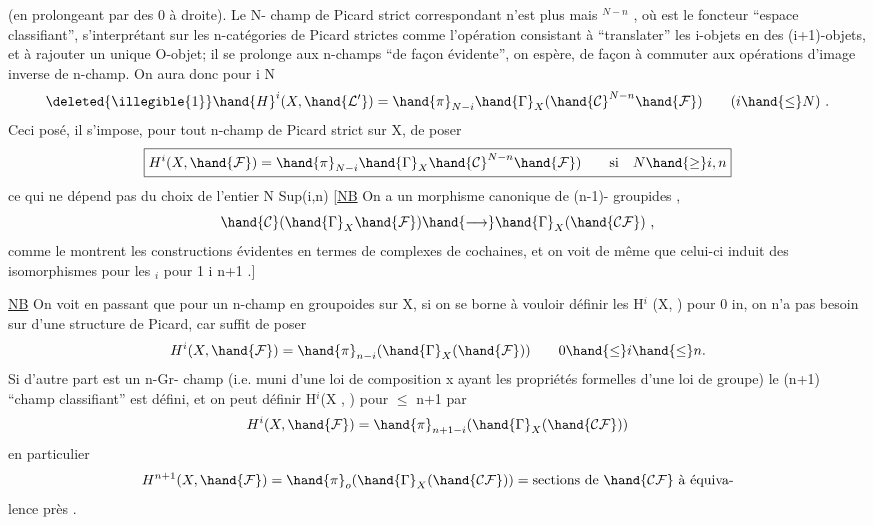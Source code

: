  

(en prolongeant  par des 0 à droite). Le N- champ de Picard
strict correspondant n'est plus  mais $^{N-n}$  , où  est le
foncteur ``espace classifiant'', s'interprétant sur les n-catégories de Picard
strictes comme l'opération consistant à ``translater'' les i-objets en des
(i+1)-objets, et à rajouter un unique O-objet; il se prolonge aux n-champs 
``de façon évidente'', on espère, de façon à commuter aux opérations d'image
inverse de n-champ. On aura donc pour i \hand{$\leq$} N
\[ \deleted{\illegible{1}}\hand{H}^{i}(X, \hand{\mathcal{L}'}) = \hand{\pi}_{N-i}\hand{\Gamma}_{X}(\hand{\mathcal{C}}^{N-n}\hand{\mathcal{F}}) \qquad (i \hand{\leq} N) \ . \]
Ceci posé, il s'impose, pour tout n-champ de Picard strict  sur X, de
poser
\[ \boxed{H^{i}(X , \hand{\mathcal{F}} ) = \hand{\pi}_{N-i}\hand{\Gamma}_{X}\hand{\mathcal{C}}^{N-n} \hand{\mathcal{F}} ) \qquad \text{si} \quad N \hand{\geq} i,n} \]
ce qui ne dépend pas du choix de l'entier N \hand{$\geq$} Sup(i,n) [\uline{NB} On a un
morphisme canonique de (n-1)- groupides ,
\[ \hand{\mathcal{C}}(\hand{\Gamma}_{X}\hand{\mathcal{F}}) \hand{\longrightarrow} \hand{\Gamma}_{X}(\hand{\mathcal{C}\mathcal{F}}) \ , \]
comme le montrent les constructions évidentes en termes de complexes de
cochaines, et on voit de même que celui-ci induit des isomorphismes pour
les \hand{$\pi$}$_{i}$ pour 1 \hand{$\leq$}i \hand{$\leq$} n+1 .]

\uline{NB} On voit en passant que pour un n-champ en groupoides  sur X, si
on se borne à vouloir définir les H$^{i}$ (X, ) pour 0 \hand{$\leq$} i\hand{$\leq$}n, on n'a pas
besoin sur  d'une structure de Picard, car  suffit de poser
\[ H^{i}( X , \hand{\mathcal{F}} ) = \hand{\pi}_{n-i}(\hand{\Gamma}_{X}(\hand{\mathcal{F}})) \qquad 0 \hand{\leq} i \hand{\leq} n. \]
Si d'autre part  est un n-Gr- champ (i.e. muni d'une loi de composition
 x  \hand{$\longrightarrow$}  ayant les propriétés formelles d'une loi de groupe)
\deleted{(}le (n+1) ``champ classifiant''\deleted{)} est défini, et on peut définir H$^{i}$(X ,  )
pour  $\leq$ n+1 par
\[ H^{i}( X , \hand{\mathcal{F}} ) = \hand{\pi}_{n+1-i} ( \hand{\Gamma}_{X}(\hand{\mathcal{C}\mathcal{F}})) \]
en particulier
\[ H^{n+1} (X , \hand{\mathcal{F}}) = \hand{\pi}_{o}(\hand{\Gamma}_{X}(\hand{\mathcal{C}\mathcal{F}})) = \text{sections de } \hand{\mathcal{C}\mathcal{F}} \text{ à équiva-}\]
lence près .

